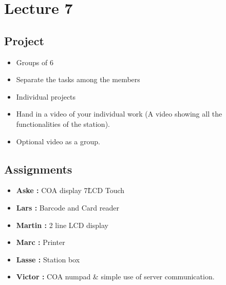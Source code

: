 \documentclass{article}
\begin{document}
\section*{Lecture 7}%
\label{sec:lecture_7}
\subsection*{Project}%
\label{sub:project}

\begin{itemize}
	\item Groups of 6
	\item Separate the tasks among the members
	\item Individual projects
	\item Hand in a video of your individual work (A video showing all the functionalities of the station).
	\item Optional video as a group.
\end{itemize}

\subsection*{Assignments}%
\label{sub:assignments}

\begin{itemize}
	\item \textbf{Aske : } COA display 7\" LCD Touch
	\item \textbf{Lars : } Barcode and Card reader
	\item \textbf{Martin : } 2 line LCD display
	\item \textbf{Marc : } Printer
	\item \textbf{Lasse : } Station box
	\item \textbf{Victor : } COA numpad \& simple use of server communication. 
\end{itemize}
\end{document}
